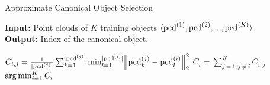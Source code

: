 \begin{algorithm}[H]

\caption{Approximate Canonical Object Selection \cite{thompson21shapebased}}\label{alg:canon_select_2} 

\begin{flushleft}
    \hspace*{\algorithmicindent} \textbf{Input:} Point clouds of $K$ training objects $\langle \mathrm{pcd}^{(1)}, \mathrm{pcd}^{(2)}, ..., \mathrm{pcd}^{(K)} \rangle$. \\
    \hspace*{\algorithmicindent} \textbf{Output:} Index of the canonical object. \\
\end{flushleft}

\begin{algorithmic}[1]

            \State $C_{i,j} = \frac{1}{|\mathrm{pcd}^{(j)}|} \sum_{k=1}^{|\mathrm{pcd}^{(j)}|} \min_{l=1}^{|\mathrm{pcd}^{(i)}|} \norm{\mathrm{pcd}^{(j)}_k - \mathrm{pcd}^{(i)}_l}_2^2$
        \EndFor
    \EndFor
        \State $C_i = \sum_{j = 1, j \neq i}^K C_{i,j}$
    \EndFor
    \State \Return $\operatorname*{arg\,min}_{i=1}^K C_i$
\end{algorithmic}

\end{algorithm}